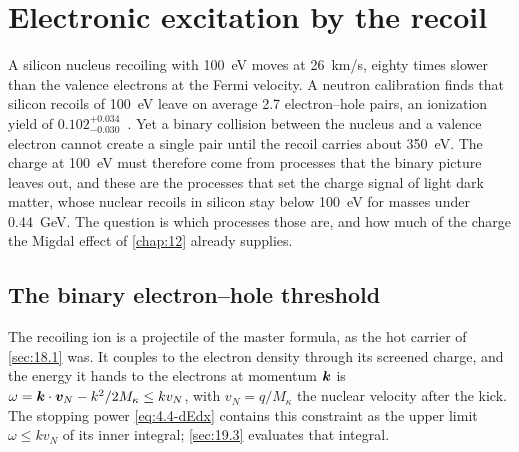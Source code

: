 \section{Electronic excitation by the recoil}\label{sec:19.2}

A silicon nucleus recoiling with \SI{100}{eV} moves at \SI{26}{km/s}, eighty times slower than the valence electrons at the Fermi velocity. A neutron calibration finds that silicon recoils of \SI{100}{eV} leave on average 2.7 electron--hole pairs, an ionization yield of $0.102^{+0.034}_{-0.030}$~\cite[Table~II]{albakry2023first}. Yet a binary collision between the nucleus and a valence electron cannot create a single pair until the recoil carries about \SI{350}{eV}. The charge at \SI{100}{eV} must therefore come from processes that the binary picture leaves out, and these are the processes that set the charge signal of light dark matter, whose nuclear recoils in silicon stay below \SI{100}{eV} for masses under \SI{0.44}{GeV}. The question is which processes those are, and how much of the charge the Migdal effect of \cref{chap:12} already supplies.

\subsection{The binary electron--hole threshold}\label{sec:19.2-binary}

The recoiling ion is a projectile of the master formula, as the hot carrier of \cref{sec:18.1} was. It couples to the electron density through its screened charge, and the energy it hands to the electrons at momentum $\bm{k}$ is $\omega = \bm{k}\cdot\bm{v}_N - k^2/2M_\kappa \le kv_N$, with $v_N = q/M_\kappa$ the nuclear velocity after the kick. The stopping power \cref{eq:4.4-dEdx} contains this constraint as the upper limit $\omega \le kv_N$ of its inner integral; \cref{sec:19.3} evaluates that integral.

